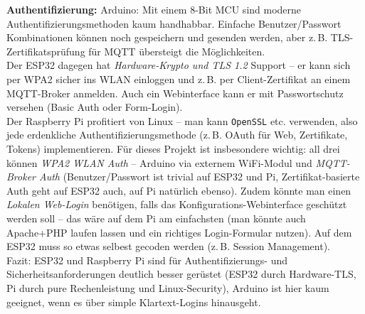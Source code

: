 \noindent\textbf{Authentifizierung:}  Arduino: Mit einem 8-Bit MCU sind moderne Authentifizierungsmethoden kaum handhabbar. Einfache Benutzer/Passwort Kombinationen können noch gespeichern und gesenden werden, aber z.\,B. TLS-Zertifikatsprüfung für MQTT übersteigt die Möglichkeiten. 
\\
Der ESP32 dagegen hat \textit{Hardware-Krypto und TLS 1.2} Support – er kann sich per WPA2 sicher ins WLAN einloggen und z.\,B. per Client-Zertifikat an einem MQTT-Broker anmelden. Auch ein Webinterface kann er mit Passwortschutz versehen (Basic Auth oder Form-Login). 
\\
Der Raspberry Pi profitiert von Linux – man kann \texttt{OpenSSL} etc. verwenden, also jede erdenkliche Authentifizierungsmethode (z.\,B. OAuth für Web, Zertifikate, Tokens) implementieren. Für dieses Projekt ist insbesondere wichtig: all drei können \textit{WPA2 WLAN Auth} – Arduino via externem WiFi-Modul und \textit{MQTT-Broker Auth} (Benutzer/Passwort ist trivial auf ESP32 und Pi, Zertifikat-basierte Auth geht auf ESP32 auch, auf Pi natürlich ebenso). Zudem könnte man einen \textit{Lokalen Web-Login} benötigen, falls das Konfigurations-Webinterface geschützt werden soll – das wäre auf dem Pi am einfachsten (man könnte auch Apache+PHP laufen lassen und ein richtiges Login-Formular nutzen). 
Auf dem ESP32 muss so etwas selbest gecoden werden (z.\,B. Session Management). 
\\
Fazit: ESP32 und Raspberry Pi sind für Authentifizierungs- und Sicherheitsanforderungen deutlich besser gerüstet (ESP32 durch Hardware-TLS, Pi durch pure Rechenleistung und Linux-Security), Arduino ist hier kaum geeignet, wenn es über simple Klartext-Logins hinausgeht.


\vspace{5mm}

